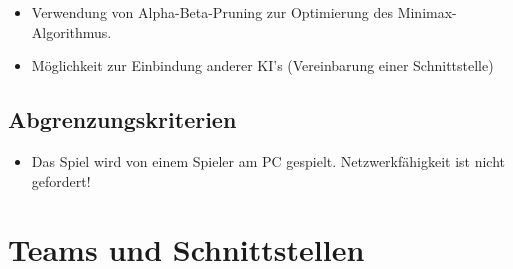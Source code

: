 \documentclass[14pt]{scrartcl}
\begin{document}
\begin{itemize}
    \item Verwendung von Alpha-Beta-Pruning zur Optimierung des Minimax-Algorithmus.
    \item Möglichkeit zur Einbindung anderer KI’s (Vereinbarung einer Schnittstelle)
\end{itemize}


\subsection{Abgrenzungskriterien}

\begin{itemize}
    \item Das Spiel wird von einem Spieler am PC gespielt. Netzwerkfähigkeit ist nicht gefordert!
\end{itemize}





\newpage
\section{Teams und Schnittstellen}
\end{document}
